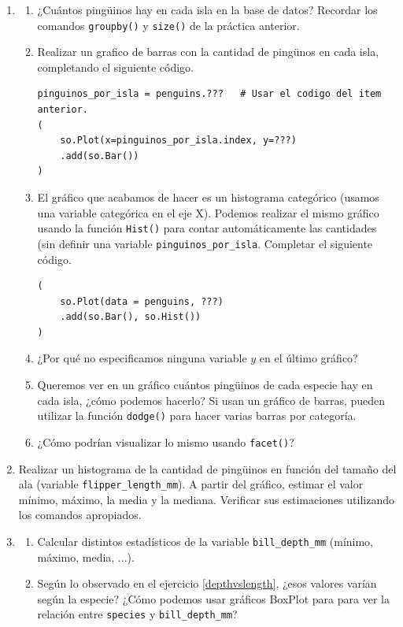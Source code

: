 \documentclass[a4paper,11pt]{article}
\theoremstyle{definition}
\begin{document}
\begin{enumerate}[resume]
\item 
\begin{enumerate}
\item ¿Cuántos pingüinos hay en cada isla en la base de datos? Recordar los comandos \lstinline{groupby()} y \lstinline{size()} de la práctica anterior.
\item Realizar un grafico de barras con la cantidad de pingünos en cada isla, completando el siguiente código.
\begin{lstlisting}
pinguinos_por_isla = penguins.???   # Usar el codigo del item anterior.
(
    so.Plot(x=pinguinos_por_isla.index, y=???)
    .add(so.Bar())
)
\end{lstlisting}
\item El gráfico que acabamos de hacer es un histograma categórico (usamos una variable categórica en el eje X). Podemos realizar el mismo gráfico usando la función \lstinline{Hist()} para contar automáticamente las cantidades (sin definir una variable \lstinline{pinguinos_por_isla}. Completar el siguiente código.
\begin{lstlisting}
(
    so.Plot(data = penguins, ???)
    .add(so.Bar(), so.Hist())
)
\end{lstlisting}
\item ¿Por qué no especificamos ninguna variable $y$ en el último gráfico?
\item Queremos ver en un gráfico cuántos pingüinos de cada especie hay en cada isla, ¿cómo podemos hacerlo? Si usan un gráfico de barras, pueden utilizar la función \lstinline{dodge()} para hacer varias barras por categoría.
\item ¿Cómo podrían visualizar lo mismo usando \lstinline{facet()}?
\end{enumerate}

\item Realizar un histograma de la cantidad de pingüinos en función del tamaño del ala (variable \lstinline{flipper_length_mm}). A partir del gráfico, estimar el valor mínimo, máximo, la media y la mediana. Verificar sus estimaciones utilizando los comandos apropiados.

\item \begin{enumerate}
\item Calcular distintos estadísticos de la variable \lstinline{bill_depth_mm} (mínimo, máximo, media, ...).
\item Según lo observado en el ejercicio \ref{depthvslength}, ¿esos valores varían según la especie? ¿Cómo podemos usar gráficos BoxPlot para para ver la relaci\'on entre \lstinline{species} y \lstinline{bill_depth_mm}?
\end{enumerate}


\end{enumerate}
\end{document}
